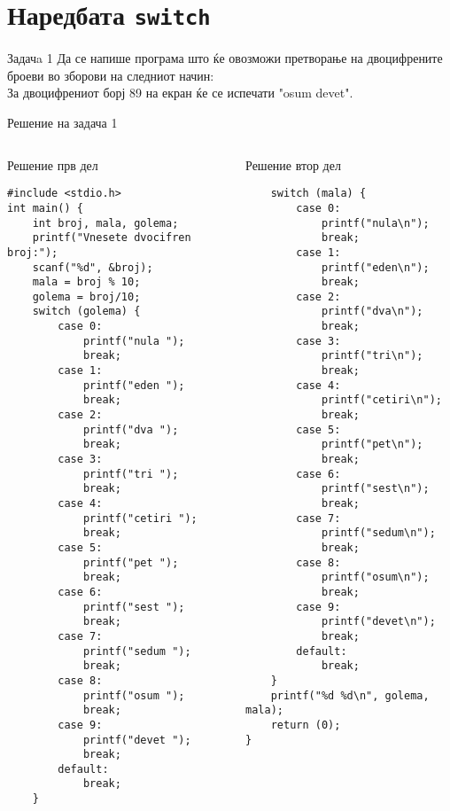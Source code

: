 \section{Наредбата \texttt{switch}}
\begin{frame}{Задачa 1}
Да се напише програма што ќе овозможи претворање на двоцифрените броеви во
зборови на следниот начин:\\
За двоцифрениот борј 89 на екран ќе се испечати
"osum devet".
\end{frame}

\begin{frame}[t,fragile,shrink=35]{Решение на задача 1}
\begin{columns}
\begin{exampleblock}{Решение прв дел}
\begin{lstlisting}
#include <stdio.h>
int main() {
    int broj, mala, golema;
    printf("Vnesete dvocifren broj:");
    scanf("%d", &broj);
    mala = broj % 10;
    golema = broj/10;
    switch (golema) {
        case 0:
            printf("nula ");
            break;
        case 1:
            printf("eden ");
            break;
        case 2:
            printf("dva ");
            break;
        case 3:
            printf("tri ");
            break;
        case 4:
            printf("cetiri ");
            break;
        case 5:
            printf("pet ");
            break;
        case 6:
            printf("sest ");
            break;
        case 7:
            printf("sedum ");
            break;
        case 8:
            printf("osum ");
            break;
        case 9:
            printf("devet ");
            break;
        default:
            break;
    }
\end{lstlisting}
\end{exampleblock}
\begin{exampleblock}{Решение втор дел}
\begin{lstlisting}
    switch (mala) {
        case 0:
            printf("nula\n");
            break;
        case 1:
            printf("eden\n");
            break;
        case 2:
            printf("dva\n");
            break;
        case 3:
            printf("tri\n");
            break;
        case 4:
            printf("cetiri\n");
            break;
        case 5:
            printf("pet\n");
            break;
        case 6:
            printf("sest\n");
            break;
        case 7:
            printf("sedum\n");
            break;
        case 8:
            printf("osum\n");
            break;
        case 9:
            printf("devet\n");
            break;
        default:
            break;
    }
    printf("%d %d\n", golema, mala);
    return (0);
}
\end{lstlisting}
\end{exampleblock}
\end{columns}
\end{frame}


